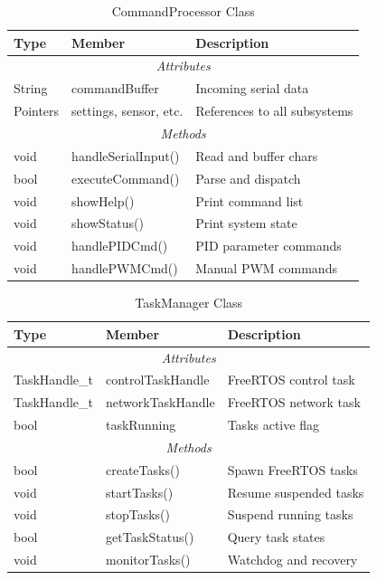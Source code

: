 \documentclass[12pt,a4paper]{article}
\begin{document}
\begin{table}[H]
\centering
\caption{CommandProcessor Class}
\label{tab:command-processor}
\begin{tabular}{|l|l|p{6cm}|}
\hline
\textbf{Type} & \textbf{Member} & \textbf{Description} \\
\hline
\multicolumn{3}{|c|}{\textit{Attributes}} \\
\hline
String & commandBuffer & Incoming serial data \\
Pointers & settings, sensor, etc. & References to all subsystems \\
\hline
\multicolumn{3}{|c|}{\textit{Methods}} \\
\hline
void & handleSerialInput() & Read and buffer chars \\
bool & executeCommand() & Parse and dispatch \\
void & showHelp() & Print command list \\
void & showStatus() & Print system state \\
void & handlePIDCmd() & PID parameter commands \\
void & handlePWMCmd() & Manual PWM commands \\
\hline
\end{tabular}
\end{table}

\begin{table}[H]
\centering
\caption{TaskManager Class}
\label{tab:task-manager}
\begin{tabular}{|l|l|p{6cm}|}
\hline
\textbf{Type} & \textbf{Member} & \textbf{Description} \\
\hline
\multicolumn{3}{|c|}{\textit{Attributes}} \\
\hline
TaskHandle\_t & controlTaskHandle & FreeRTOS control task \\
TaskHandle\_t & networkTaskHandle & FreeRTOS network task \\
bool & taskRunning & Tasks active flag \\
\hline
\multicolumn{3}{|c|}{\textit{Methods}} \\
\hline
bool & createTasks() & Spawn FreeRTOS tasks \\
void & startTasks() & Resume suspended tasks \\
void & stopTasks() & Suspend running tasks \\
bool & getTaskStatus() & Query task states \\
void & monitorTasks() & Watchdog and recovery \\
\hline
\end{tabular}
\end{table}
\end{document}
